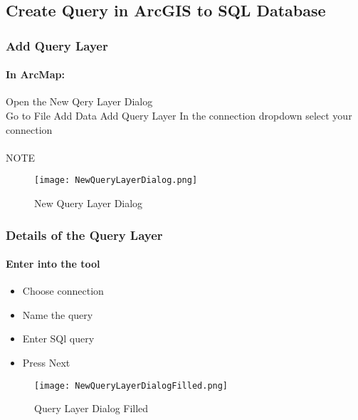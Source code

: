 \documentclass[class=article , crop=false, titlepage, twoside, multi={itemize, figure, verbatim}, float=false]{standalone}
\title{}  %
\begin{document}
\ifstandalone
\maketitle %
\tableofcontents %
\clearpage
\fi

\subsection{Create Query in ArcGIS to SQL Database}
\medskip
\subsubsection[Add Query Layer ]{\Large Add Query Layer}
\paragraph{In ArcMap: \texorpdfstring{\\}{}}
Open the New Qery Layer Dialog\\
Go to File Add Data Add Query Layer
In the connection dropdown select your connection
\paragraph*{}NOTE
\begin{figure}[h!]
\centering
    \texttt{[image: NewQueryLayerDialog.png]}
\caption{New Query Layer Dialog}
\end{figure}
\clearpage
\subsubsection[Details of the Query Layer]{\Large Details of the Query Layer}
\paragraph{Enter into the tool \texorpdfstring{\\}{}}
\begin{itemize}
  \item Choose connection
  \item Name the query
  \item Enter SQl query
  \item Press Next
\end{itemize}
\begin{figure}[h!]
\centering
    \texttt{[image: NewQueryLayerDialogFilled.png]}
\caption{Query Layer Dialog Filled}
\end{figure}
\clearpage
\end{document}
